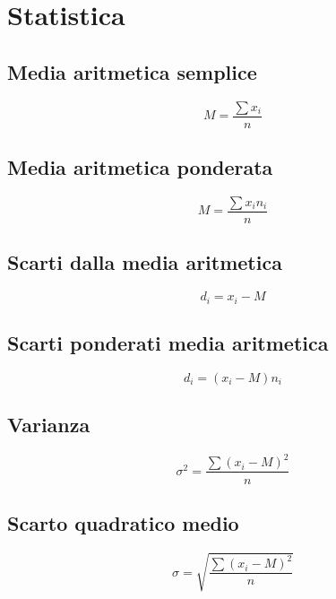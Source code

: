 \chapter{Statistica}
\section{Media aritmetica semplice}
\begin{equation}
M=\dfrac{\sum x_i}{n}
\end{equation}
\section{Media aritmetica ponderata}
\begin{equation}
M=\dfrac{\sum x_i n_i}{n}
\end{equation}
\section{Scarti dalla media aritmetica}
\begin{equation}
d_i=x_i-M
\end{equation}
\section{Scarti ponderati media aritmetica}
\begin{equation}
d_i=(x_i-M)n_i
\end{equation}
\section{Varianza}
\begin{equation}
\sigma^2=\dfrac{\sum(x_i-M)^2}{n}
\end{equation}
\section{Scarto quadratico medio}
\begin{equation}
\sigma=\sqrt{\dfrac{\sum(x_i-M)^2}{n}}
\end{equation}